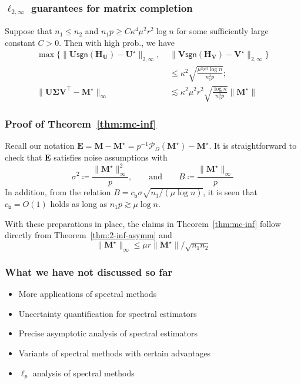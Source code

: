 \documentclass[compress,
mathserif,wide,%
]{beamer}
\begin{document}
\begin{frame}
	\frametitle{$\ell_{2,\infty}$ guarantees for matrix completion}
\begin{theorem}
\label{thm:mc-inf}
Suppose that $n_1\leq n_2$ and $n_{1}p\geq C\kappa^{4}\mu^{2}r^{2}\log n$ for some
sufficiently large constant $C>0$. Then with high prob., we have
%
\begin{subequations}
%
\begin{align*}
\max\{\|\bm{U}\mathsf{sgn}(\bm{H}_{\bm{U}})-\bm{U}^{\star}\|_{2,\infty},\,\,&\|\bm{V}\mathsf{sgn}(\bm{H}_{\bm{V}})-\bm{V}^{\star}\|_{2,\infty}\} \nonumber\\& \leq\kappa^{2}\sqrt{\frac{\mu^{3}r^{3}\log n}{n_{1}^{2}p}};
\\
\|\bm{U}\bm{\Sigma}\bm{V}^{\top}-\bm{M}^{\star}\|_{\infty} & \lesssim\kappa^{2}\mu^{2}r^{2}\sqrt{\frac{\log n}{n_{1}^{3}p}}\|\bm{M}^{\star}\|
\end{align*}
%
\end{subequations}
%
\end{theorem}
\end{frame}

\begin{frame}
	\frametitle{Proof of Theorem~\ref{thm:mc-inf}}
	Recall our notation $\bm{E}= \bm{M}  -\bm{M}^{\star}= p^{-1}\mathcal{P}_{\Omega}(\bm{M}^{\star})-\bm{M}^{\star}$.
 It is straightforward to check
that $\bm{E}$ satisfies noise assumptions with
%
\begin{equation*}
\sigma^{2}\coloneqq\frac{\|\bm{M}^{\star}\|_{\infty}^{2}}{p},\qquad\text{and}\qquad B\coloneqq\frac{\|\bm{M}^{\star}\|_{\infty}}{p}
\end{equation*}
%
In addition, from the relation $B= c_{\mathsf{b}}\sigma\sqrt{n_1/({\mu}\log n)}$, it is seen that $c_{\mathsf{b}}= O(1)$
holds as long as $n_{1}p\gtrsim\mu\log n$.

\vfill
With these preparations in place, the claims in Theorem~\ref{thm:mc-inf} follow
directly from Theorem~\ref{thm:2-inf-asymm} and 
\[
\|\bm{M}^{\star}\|_{\infty}  \leq\mu r  \big\| \bm{M}^{\star} \big\| /\sqrt{n_{1}n_{2}}
\]
\end{frame}

\begin{frame}
	\frametitle{What we have not discussed so far}
	\begin{itemize}
		\itemsep 0.5em
		\item More applications of spectral methods
		\item Uncertainty quantification for spectral estimators
		\item Precise asymptotic analysis of spectral estimators
		\item Variants of spectral methods with certain advantages
		\item $\ell_{p}$ analysis of spectral methods
	\end{itemize}
\end{frame}
\end{document}
